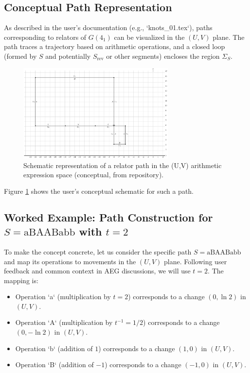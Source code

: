 \documentclass{article}
\begin{document}
\subsection{Conceptual Path Representation}
As described in the user's documentation (e.g., `knots_01.tex`), paths corresponding to relators of $G(4_1)$ can be visualized in the $(U,V)$ plane. The path traces a trajectory based on arithmetic operations, and a closed loop (formed by $S$ and potentially $S_{\text{rev}}$ or other segments) encloses the region $\Sigma_S$.

\begin{figure}[h!]
    \centering
    \includegraphics[width=0.7\textwidth]{../../images/knot_4_1.pdf} %
    \caption{Schematic representation of a relator path in the (U,V) arithmetic expression space (conceptual, from repository).}
    \label{fig:uv_path_conceptual_q2}
\end{figure}

Figure \ref{fig:uv_path_conceptual_q2} shows the user's conceptual schematic for such a path.

\subsection{Worked Example: Path Construction for $S = \text{aBAABabb}$ with $t=2$}
To make the concept concrete, let us consider the specific path $S = \text{aBAABabb}$ and map its operations to movements in the $(U,V)$ plane. Following user feedback and common context in AEG discussions, we will use $t=2$. The mapping is:
\begin{itemize}
    \item Operation `a` (multiplication by $t=2$) corresponds to a change $(0, \ln 2)$ in $(U,V)$.
    \item Operation `A` (multiplication by $t^{-1}=1/2$) corresponds to a change $(0, -\ln 2)$ in $(U,V)$.
    \item Operation `b` (addition of $1$) corresponds to a change $(1, 0)$ in $(U,V)$.
    \item Operation `B` (addition of $-1$) corresponds to a change $(-1, 0)$ in $(U,V)$.
\end{itemize}
\end{document}
